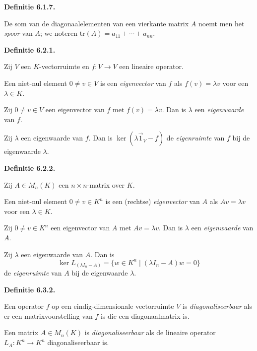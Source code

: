 \documentclass[10pt,a4paper]{article}
\newenvironment{res}[1]{%
  \par\noindent\textbf{Definitie #1.}~\ignorespaces
}{%
  \par\vspace{2pt}\normalfont
}
\begin{document}
\begin{res}{6.1.7}
De som van de diagonaalelementen van een vierkante matrix $A$ noemt men het \textit{spoor} van $A$; we noteren $\mathrm{tr}(A)=a_{11}+\cdots+a_{nn}$.
\end{res}

\begin{res}{6.2.1}
Zij $V$ een $K$-vectorruimte en $f:V\to V$ een lineaire operator.
\begin{myenum}
\item Een niet-nul element $0\ne v\in V$ is een \textit{eigenvector} van $f$ als $f(v)=\lambda v$ voor een $\lambda\in K$.
\item Zij $0\ne v\in V$ een eigenvector van $f$ met $f(v)=\lambda v$. Dan is $\lambda$ een \textit{eigenwaarde} van $f$.
\item Zij $\lambda$ een eigenwaarde van $f$. Dan is $\ker(\lambda\vec 1_V-f)$ de \textit{eigenruimte} van $f$ bij de eigenwaarde $\lambda$.
\end{myenum}
\end{res}

\begin{res}{6.2.2}
Zij $A\in M_n(K)$ een $n\times n$-matrix over $K$.
\begin{myenum}
\item Een niet-nul element $0\ne v\in K^n$ is een (rechtse) \textit{eigenvector} van $A$ als $Av=\lambda v$ voor een $\lambda\in K$.
\item Zij $0\ne v\in K^n$ een eigenvector van $A$ met $Av=\lambda v$. Dan is $\lambda$ een \textit{eigenwaarde} van $A$.
\item Zij $\lambda$ een eigenwaarde van $A$. Dan is
\[
\ker L_{(\lambda I_n-A)}=\{w\in K^n \mid (\lambda I_n-A)w=0\}
\]
de \textit{eigenruimte} van $A$ bij de eigenwaarde $\lambda$.
\end{myenum}
\end{res}

\begin{res}{6.3.2}
\begin{myenum}
\item Een operator $f$ op een eindig-dimensionale vectorruimte $V$ is \textit{diagonaliseerbaar} als er een matrixvoorstelling van $f$ is die een diagonaalmatrix is.
\item Een matrix $A\in M_n(K)$ is \textit{diagonaliseerbaar} als de lineaire operator $L_A:K^n\to K^n$ diagonaliseerbaar is.
\end{myenum}
\end{res}
\end{document}
